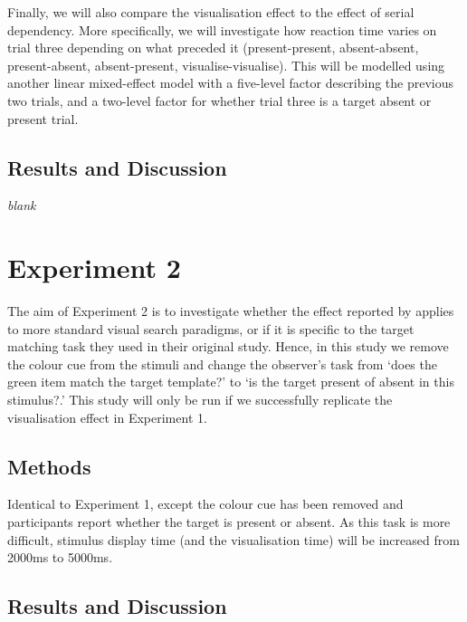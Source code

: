 \documentclass[smallextended]{svjour3}       %
\begin{document}
Finally, we will also compare the visualisation effect to the effect of serial dependency. More specifically, we will investigate how reaction time varies on trial three depending on what preceded it (present-present, absent-absent, present-absent, absent-present, visualise-visualise). This will be modelled using another linear mixed-effect model with a five-level factor describing the previous two trials, and a two-level factor for whether trial three is a target absent or present trial.

\subsection{Results and Discussion}

\begin{center}
\textit{blank}
\end{center}

\section{Experiment 2}
\label{sec:exp2}

The aim of Experiment 2 is to investigate whether the effect reported by \cite{reinhart2015} applies to more standard visual search paradigms, or if it is specific to the target matching task they used in their original study. Hence, in this study we remove the colour cue from the stimuli and change the observer's task from `does the green item match the target template?' to `is the target present of absent in this stimulus?.' This study will only be run if we successfully replicate the visualisation effect in Experiment 1. 

\subsection{Methods}

Identical to Experiment 1, except the colour cue has been removed and participants report whether the target is present or absent. As this task is more difficult, stimulus display time (and the visualisation time) will be increased from 2000ms to 5000ms. 

\subsection{Results and Discussion}
\end{document}
